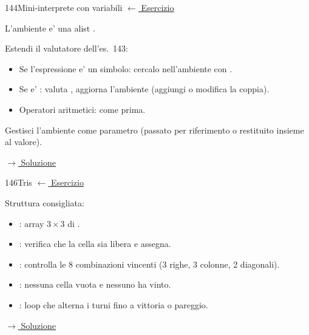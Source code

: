 \label{hint:144}
\begin{hintbox}{144}{Mini-interprete con variabili}
\small\color{black!55}\hyperref[ex:144]{$\leftarrow$ Esercizio}\normalsize\color{black}

L'ambiente e' una alist .

Estendi il valutatore dell'es.~143:
\begin{itemize}[leftmargin=2em]
  \item Se l'espressione e' un simbolo: cercalo nell'ambiente
        con .
  \item Se e' : valuta , aggiorna
        l'ambiente (aggiungi o modifica la coppia).
  \item Operatori aritmetici: come prima.
\end{itemize}
Gestisci l'ambiente come parametro (passato per riferimento
o restituito insieme al valore).

\small\color{black!55}\hyperref[sol:144]{$\rightarrow$ Soluzione}\normalsize\color{black}
\end{hintbox}


\label{hint:146}
\begin{hintbox}{146}{Tris}
\small\color{black!55}\hyperref[ex:146]{$\leftarrow$ Esercizio}\normalsize\color{black}

Struttura consigliata:
\begin{itemize}[leftmargin=2em]
  \item {}: array $3 \times 3$ di .
  \item {}: verifica
        che la cella sia libera e assegna.
  \item {}: controlla le 8
        combinazioni vincenti (3 righe, 3 colonne, 2 diagonali).
  \item {}: nessuna cella vuota e nessuno ha vinto.
  \item {}: loop che alterna i turni fino a vittoria o pareggio.
\end{itemize}

\small\color{black!55}\hyperref[sol:146]{$\rightarrow$ Soluzione}\normalsize\color{black}
\end{hintbox}

